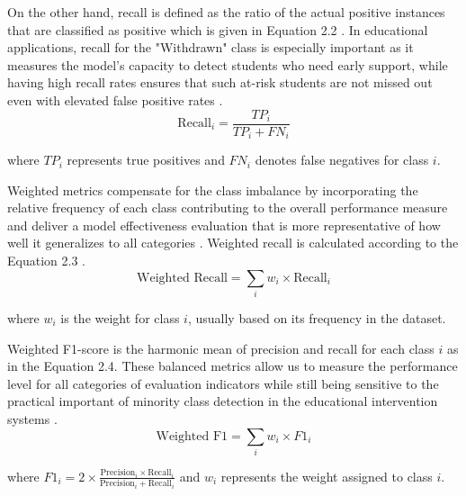 \documentclass[ %
                    author={Carlos Duran Calle},
                supervisor={Dr. Felipe Campelo},
                    degree={MSc},
                     title={Comparative Machine Learning Analysis for Student Dropout Prediction in a Virtual Learning Environment},
                  subtitle={Incorporating Student Engagement and Socio-Economic Features},
                      type={},
                      year={2025}]{dissertation}
\begin{document}
On the other hand, recall is defined as the ratio of the actual positive instances that are classified as positive which is given in Equation 2.2 \cite{sokolova_classification_tasks_2009}. In educational applications, recall for the "Withdrawn" class is especially important as it measures the model's capacity to detect students who need early support, while having high recall rates ensures that such at-risk students are not missed out even with elevated false positive rates \cite{grandini_metrics_2020}.
\begin{equation}
	\text{Recall}_{i} = \frac{TP_{i}}{TP_{i} + FN_{i}}
	\tag{2.2}
\end{equation}
\begin{center}
	where $TP_{i}$ represents true positives and $FN_{i}$ denotes false negatives for class $i$.
\end{center}

Weighted metrics compensate for the class imbalance by incorporating the relative frequency of each class contributing to the overall performance measure and deliver a model effectiveness evaluation that is more representative of how well it generalizes to all categories \cite{jeni_facing_2013}. Weighted recall is calculated according to the Equation 2.3 \cite{tantisripreecha_novel_2022}.
\begin{equation}
	\text{Weighted Recall} = \sum_{i} w_{i} \times \text{Recall}_{i}
	\tag{2.3}
\end{equation}
\begin{center}
	where $w_{i}$ is the weight for class $i$, usually based on its frequency in the dataset.
\end{center}

Weighted F1-score is the harmonic mean of precision and recall for each class $i$ \cite{tantisripreecha_novel_2022} \cite{opitz_closer_2024} as in the Equation 2.4. These balanced metrics allow us to measure the performance level for all categories of evaluation indicators while still being sensitive to the practical important of minority class detection in the educational intervention systems \cite{krawczyk_learning_2016}.
\begin{equation}
	\text{Weighted F1} = \sum_{i} w_{i} \times F1_{i}
	\tag{2.4}
\end{equation}
\begin{center}
	where $F1_{i} = 2 \times \frac{\text{Precision}_{i} \times \text{Recall}_{i}}{\text{Precision}_{i} + \text{Recall}_{i}}$ 
	and $w_{i}$ represents the weight assigned to class $i$.
\end{center}
\end{document}
